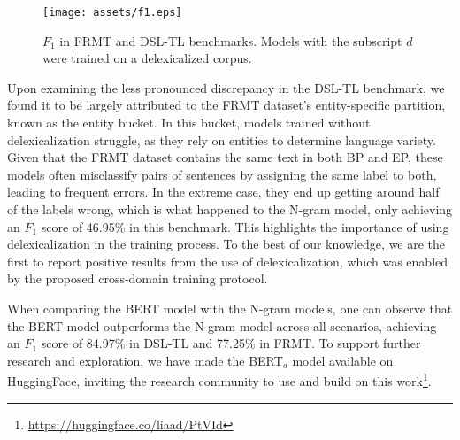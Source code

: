 \begin{figure}
    \centering
    \texttt{[image: assets/f1.eps]}
    \caption{$F_1$ in FRMT and DSL-TL benchmarks. Models with the subscript $d$ were trained on a delexicalized corpus.}
    \label{fig:results}
\end{figure}

Upon examining the less pronounced discrepancy in the DSL-TL benchmark, we found it to be largely attributed to the FRMT dataset's entity-specific partition, known as the entity bucket. In this bucket, models trained without delexicalization struggle, as they rely on entities to determine language variety. Given that the FRMT dataset contains the same text in both BP and EP, these models often misclassify pairs of sentences by assigning the same label to both, leading to frequent errors. In the extreme case, they end up getting around half of the labels wrong, which is what happened to the N-gram model, only achieving an $F_1$ score of 46.95\% in this benchmark. This highlights the importance of using delexicalization in the training process. To the best of our knowledge, we are the first to report positive results from the use of delexicalization, which was enabled by the proposed cross-domain training protocol. 

When comparing the BERT model with the N-gram models, one can observe that the BERT model outperforms the N-gram model across all scenarios, achieving an $F_1$ score of  84.97\% in DSL-TL and 77.25\% in FRMT. To support further research and exploration, we have made the BERT$_d$ model available on HuggingFace, inviting the research community to use and build on this work\footnote{\url{https://huggingface.co/liaad/PtVId}}.

